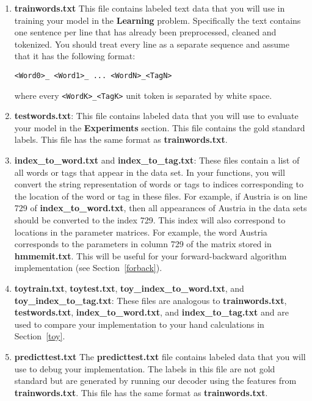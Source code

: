 \documentclass[11pt,addpoints,answers]{exam}
\numberwithin{equation}{section} %
\numberwithin{figure}{section} %
\numberwithin{table}{section} %
\begin{document}
\begin{enumerate}

\item \textbf{trainwords.txt} This file contains labeled text data that you will use in training your model in the \textbf{Learning} problem. Specifically the text contains one sentence per line that has already been preprocessed, cleaned and tokenized. You should treat every line as a separate sequence and assume that it has the following format:

    \texttt{<Word0>\_<Tag0> <Word1>\_<Tag1> ... <WordN>\_<TagN>}

where every \texttt{<WordK>\_<TagK>} unit token is separated by white space.

\item \textbf{testwords.txt}: This file contains labeled data that you will use to evaluate your model in the \textbf{Experiments} section. This file contains the gold standard labels.  This file has the same format as \textbf{trainwords.txt}.

\item \textbf{index\_to\_word.txt} and \textbf{index\_to\_tag.txt}: These files contain a list of all words or tags that appear in the data set. In your functions, you will convert the string representation of words or tags to indices corresponding to the location of the word or tag in these files. For example, if Austria is on line 729 of \textbf{index\_to\_word.txt}, then all appearances of Austria in the data sets should be converted to the index 729. This index will also correspond to locations in the parameter matrices. For example, the word Austria corresponds to the parameters in column 729 of the matrix stored in \textbf{hmmemit.txt}. This will be useful for your forward-backward algorithm implementation (see Section~\ref{forback}).

\item \textbf{toytrain.txt}, \textbf{toytest.txt}, \textbf{toy\_index\_to\_word.txt}, and \textbf{toy\_index\_to\_tag.txt}: These files are analogous to \textbf{trainwords.txt}, \textbf{testwords.txt}, \textbf{index\_to\_word.txt}, and \textbf{index\_to\_tag.txt} and are used to compare your implementation to your hand calculations in Section~\ref{toy}.

\item \textbf{predicttest.txt} The \textbf{predicttest.txt} file contains labeled data that you will use to debug your implementation. The labels in this file are not gold standard but are generated by running our decoder using the features from \textbf{trainwords.txt}. This file has the same format as \textbf{trainwords.txt}.


\end{enumerate}
\end{document}
